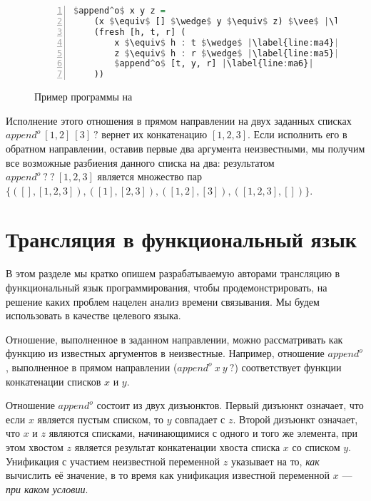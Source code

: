\documentclass[conference,american,russian]{IEEEtran}
\begin{document}
\begin{figure}[h!]
  \begin{center}
  \begin{minipage}{0.3\textwidth}
  \begin{lstlisting}[language=Haskell, frame=single, numbers=left,numberstyle=\small, escapechar=|]
  $append^o$ x y z =
    (x $\equiv$ [] $\wedge$ y $\equiv$ z) $\vee$ |\label{line:ma2}|
    (fresh [h, t, r] (
        x $\equiv$ h : t $\wedge$ |\label{line:ma4}|
        z $\equiv$ h : r $\wedge$ |\label{line:ma5}|
        $append^o$ [t, y, r] |\label{line:ma6}|
    ))
    \end{lstlisting}
  \end{minipage}
  \end{center}
  \caption{Пример программы на \miniKanren{}}
  \label{lst:appendoDEF}
\end{figure}

Исполнение этого отношения в прямом направлении на двух заданных списках $append^o \ [1,2] \ [3] \ ?$ вернет их конкатенацию $[1,2,3]$.
Если исполнить его в обратном направлении, оставив первые два аргумента неизвестными, мы получим все возможные разбиения данного списка на два: результатом $append^o \ ? \ ? \ [1,2,3]$ является множество пар $\{([],[1,2,3]), ([1], [2,3]), ([1,2], [3]), ([1,2,3], [])\}$.

\section{Трансляция в функциональный язык}\label{translator}

В этом разделе мы кратко опишем разрабатываемую авторами трансляцию \miniKanren{} в функциональный язык программирования, чтобы продемонстрировать, на решение каких проблем нацелен анализ времени связывания.
Мы будем использовать \haskell{} в качестве целевого языка. 

Отношение, выполненное в заданном направлении, можно рассматривать как функцию из известных аргументов в неизвестные. 
Например, отношение $append^o$, выполненное в прямом направлении ($append^o \ x \ y \ ?$) соответствует функции конкатенации списков $x$ и $y$. 

Отношение $append^o$ состоит из двух дизъюнктов. 
Первый дизъюнкт означает, что если $x$ является пустым списком, то $y$ совпадает с $z$. 
Второй дизъюнкт означает, что $x$ и $z$ являются списками, начинающимися с одного и того же элемента, при этом хвостом $z$ является результат конкатенации хвоста списка $x$ со списком $y$. 
Унификация с участием неизвестной переменной $z$ указывает на то, \emph{как} вычислить её значение, в то время как унификация  известной переменной $x$ --- \emph{при каком условии}.
\end{document}

